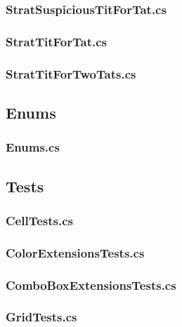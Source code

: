 \documentclass[a4paper, french]{article}
\begin{document}
\subsubsection{StratSuspiciousTitForTat.cs}


\subsubsection{StratTitForTat.cs}


\subsubsection{StratTitForTwoTats.cs}


\pagebreak
\subsection{Enums}
\subsubsection{Enums.cs}


\pagebreak
\subsection{Tests}
\subsubsection{CellTests.cs}


\subsubsection{ColorExtensionsTests.cs}


\subsubsection{ComboBoxExtensionsTests.cs}


\subsubsection{GridTests.cs}

\end{document}
